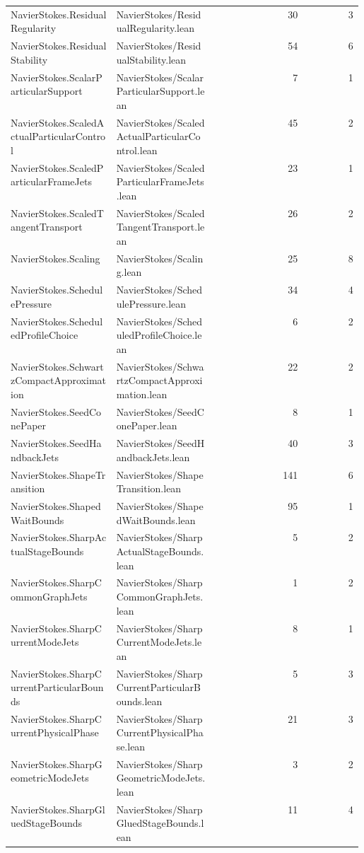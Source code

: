 \begin{longtable}{p{0.30\linewidth}p{0.28\linewidth}rr}
NavierStokes.ResidualRegularity & NavierStokes/ResidualRegularity.lean & 30 & 3\\
NavierStokes.ResidualStability & NavierStokes/ResidualStability.lean & 54 & 6\\
NavierStokes.ScalarParticularSupport & NavierStokes/ScalarParticularSupport.lean & 7 & 1\\
NavierStokes.ScaledActualParticularControl & NavierStokes/ScaledActualParticularControl.lean & 45 & 2\\
NavierStokes.ScaledParticularFrameJets & NavierStokes/ScaledParticularFrameJets.lean & 23 & 1\\
NavierStokes.ScaledTangentTransport & NavierStokes/ScaledTangentTransport.lean & 26 & 2\\
NavierStokes.Scaling & NavierStokes/Scaling.lean & 25 & 8\\
NavierStokes.SchedulePressure & NavierStokes/SchedulePressure.lean & 34 & 4\\
NavierStokes.ScheduledProfileChoice & NavierStokes/ScheduledProfileChoice.lean & 6 & 2\\
NavierStokes.SchwartzCompactApproximation & NavierStokes/SchwartzCompactApproximation.lean & 22 & 2\\
NavierStokes.SeedConePaper & NavierStokes/SeedConePaper.lean & 8 & 1\\
NavierStokes.SeedHandbackJets & NavierStokes/SeedHandbackJets.lean & 40 & 3\\
NavierStokes.ShapeTransition & NavierStokes/ShapeTransition.lean & 141 & 6\\
NavierStokes.ShapedWaitBounds & NavierStokes/ShapedWaitBounds.lean & 95 & 1\\
NavierStokes.SharpActualStageBounds & NavierStokes/SharpActualStageBounds.lean & 5 & 2\\
NavierStokes.SharpCommonGraphJets & NavierStokes/SharpCommonGraphJets.lean & 1 & 2\\
NavierStokes.SharpCurrentModeJets & NavierStokes/SharpCurrentModeJets.lean & 8 & 1\\
NavierStokes.SharpCurrentParticularBounds & NavierStokes/SharpCurrentParticularBounds.lean & 5 & 3\\
NavierStokes.SharpCurrentPhysicalPhase & NavierStokes/SharpCurrentPhysicalPhase.lean & 21 & 3\\
NavierStokes.SharpGeometricModeJets & NavierStokes/SharpGeometricModeJets.lean & 3 & 2\\
NavierStokes.SharpGluedStageBounds & NavierStokes/SharpGluedStageBounds.lean & 11 & 4\\

\end{longtable}
